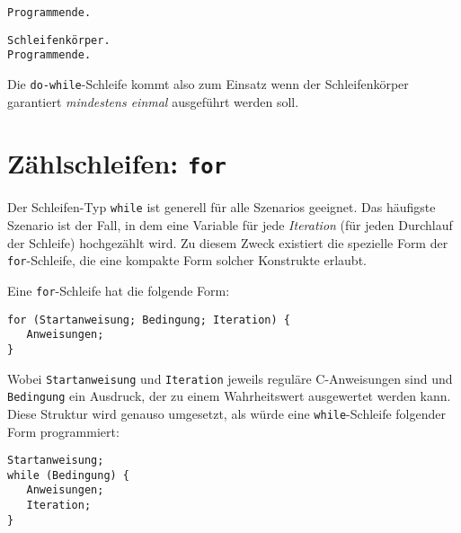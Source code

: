 \begin{tcbraster}[raster columns=2,
                  raster equal height,
                  nobeforeafter,
                  raster column skip=0.5cm]
\begin{cmdbox}
\begin{verbatim}
Programmende.
\end{verbatim}
\end{cmdbox}
%
\begin{cmdbox}
\begin{verbatim}
Schleifenkörper.
Programmende.
\end{verbatim}
\end{cmdbox}
\end{tcbraster}

Die \texttt{do-while}-Schleife kommt also zum Einsatz wenn der Schleifenkörper garantiert \emph{mindestens einmal} ausgeführt werden soll.

\section{Zählschleifen: \texttt{for}}
Der Schleifen-Typ \texttt{while} ist generell für alle Szenarios geeignet. Das häufigste Szenario ist der Fall, in dem eine Variable für jede \emph{Iteration} (\ie für jeden Durchlauf der Schleife) hochgezählt wird. Zu diesem Zweck existiert die spezielle Form der \texttt{for}-Schleife, die eine kompakte Form solcher Konstrukte erlaubt.

Eine \texttt{for}-Schleife hat die folgende Form:
\begin{codebox}
\begin{verbatim}
for (Startanweisung; Bedingung; Iteration) {
   Anweisungen;
}
\end{verbatim}
\end{codebox}

Wobei \texttt{Startanweisung} und \texttt{Iteration} jeweils reguläre C-Anweisungen sind und \texttt{Bedingung} ein Ausdruck, der zu einem Wahrheitswert ausgewertet werden kann. Diese Struktur wird genauso umgesetzt, als würde eine \texttt{while}-Schleife folgender Form programmiert:

\begin{codebox}
\begin{verbatim}
Startanweisung;
while (Bedingung) {
   Anweisungen;
   Iteration;
}
\end{verbatim}
\end{codebox}

